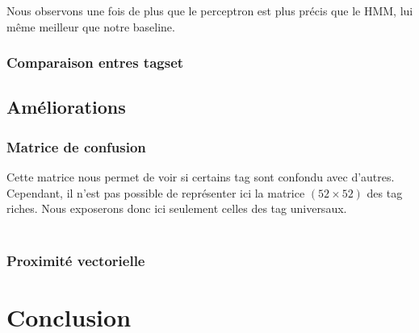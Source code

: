 \documentclass{article}
\begin{document}
Nous observons une fois de plus que le perceptron est plus précis que le HMM, lui même meilleur que notre baseline. 

\subsubsection{Comparaison entres tagset}

\subsection{Améliorations}

\subsubsection{Matrice de confusion}

Cette matrice nous permet de voir si certains tag sont confondu avec d'autres. Cependant, il n'est pas possible de représenter ici la matrice $(52 \times 52)$ des tag riches. Nous exposerons donc ici seulement celles des tag universaux.

$$
\begin{array}{l|c|c|c|c|c|c|c|c|c|c|c|c}
\end{array}
$$

\subsubsection{Proximité vectorielle}
\section{Conclusion}
\end{document}
